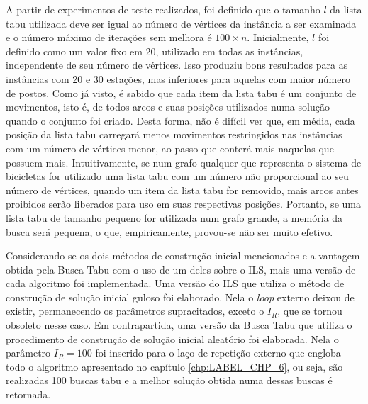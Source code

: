 \par A partir de experimentos de teste realizados, foi definido que o tamanho $l$ da lista tabu utilizada deve ser igual ao número de vértices da instância a ser examinada e o número máximo de iterações sem melhora é $100 \times n$. Inicialmente, $l$ foi definido como um valor fixo em 20, utilizado em todas as instâncias, independente de seu número de vértices. Isso produziu bons resultados para as instâncias com 20 e 30 estações, mas inferiores para aquelas com maior número de postos. Como já visto, é sabido que cada item da lista tabu é um conjunto de movimentos, isto é, de todos arcos e suas posições utilizados numa solução quando o conjunto foi criado. Desta forma, não é difícil ver que, em média, cada posição da lista tabu carregará menos movimentos restringidos nas instâncias com um número de vértices menor, ao passo que conterá mais naquelas que possuem mais. Intuitivamente, se num grafo qualquer que representa o sistema de bicicletas for utilizado uma lista tabu com um número não proporcional ao seu número de vértices, quando um item da lista tabu for removido, mais arcos antes proibidos serão liberados para uso em suas respectivas posições. Portanto, se uma lista tabu de tamanho pequeno for utilizada num grafo grande, a memória da busca será pequena, o que, empiricamente, provou-se não ser muito efetivo.

\par Considerando-se os dois métodos de construção inicial mencionados e a vantagem obtida pela Busca Tabu com o uso de um deles sobre o ILS, mais uma versão de cada algoritmo foi implementada. Uma versão do ILS que utiliza o método de construção de solução inicial guloso foi elaborado. Nela o \textit{loop} externo deixou de existir, permanecendo os parâmetros supracitados, exceto o $I_R$, que se tornou obsoleto nesse caso. Em contrapartida, uma versão da Busca Tabu que utiliza o procedimento de construção de solução inicial aleatório foi elaborada. Nela o parâmetro $I_R = 100$ foi inserido para o laço de repetição externo que engloba todo o algoritmo apresentado no capítulo \ref{chp:LABEL_CHP_6}, ou seja, são realizadas 100 buscas tabu e a melhor solução obtida numa dessas buscas é retornada.


